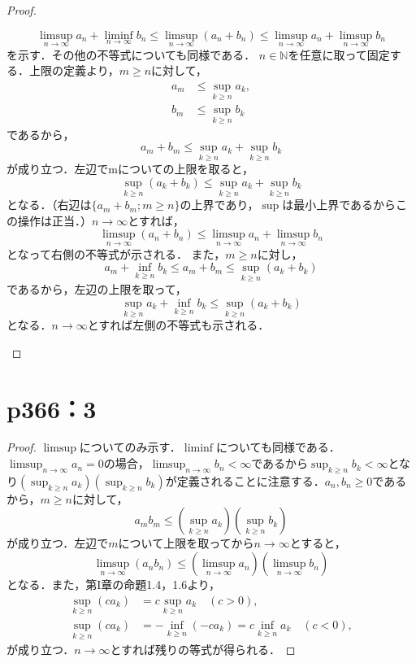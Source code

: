 \documentclass[a4paper,10pt,fleqn]{ltjsarticle}
\begin{document}
  \begin{proof}
    \begin{leftbar}
      \[
        \limsup _{n \to \infty} a_n + \liminf _{n \to \infty} b_n \leq \limsup _{n \to \infty} (a_n + b_n) \leq \limsup _{n \to \infty} a_n + \limsup _{n \to \infty} b_n
      \]
      を示す．その他の不等式についても同様である．
      $n \in \mathbb{N}$を任意に取って固定する．上限の定義より，$m \geq n$に対して，
      \begin{align*}
        a_m &\leq \sup _{k \geq n} a_k, \\
        b_m &\leq \sup _{k \geq n} b_k
      \end{align*}
      であるから，
      \[
        a_m + b_m \leq \sup _{k \geq n} a_k + \sup _{k \geq n} b_k
      \]
      が成り立つ．左辺でmについての上限を取ると，
      \[
        \sup _{k \geq n} (a_k + b_k) \leq \sup _{k \geq n} a_k + \sup _{k \geq n} b_k
      \]
      となる．（右辺は$\{a_m + b_m; m \geq n\}$の上界であり，$\sup$は最小上界であるからこの操作は正当．）$n \to \infty$とすれば，
      \[
        \limsup _{n \to \infty} (a_n + b_n) \leq \limsup _{n \to \infty} a_n + \limsup _{n \to \infty} b_n
      \]
      となって右側の不等式が示される．
      また，$m \geq n$に対し，
      \[
        a_m + \inf _{k \geq n} b_k \leq a_m + b_m \leq \sup _{k \geq n} (a_k + b_k)
      \]
      であるから，左辺の上限を取って，
      \[
        \sup _{k \geq n} a_k + \inf _{k \geq n} b_k \leq \sup _{k \geq n} (a_k + b_k)
      \]
      となる．$n \to \infty$とすれば左側の不等式も示される．
    \end{leftbar}
  \end{proof}

\section*{p366：3}

  \begin{leftbar}
    \begin{proof}
      $\limsup$についてのみ示す．$\liminf$についても同様である．
      $\limsup_{n \to \infty} a_n = 0$の場合，$\limsup_{n \to \infty} b_n < \infty$であるから$\sup_{k \geq n} b_k < \infty$となり$\left(\sup _{k \geq n} a_k\right) \left(\sup _{k \geq n} b_k\right)$が定義されることに注意する．$a_n, b_n \geq 0$であるから，$m \geq n$に対して，
      \[
        a_m b_m \leq \left(\sup _{k \geq n} a_k\right) \left(\sup _{k \geq n} b_k\right)
      \]
      が成り立つ．左辺で$m$について上限を取ってから$n \to \infty$とすると，
      \[
        \limsup_{n \to \infty} (a_n b_n) \leq \left(\limsup _{n \to \infty} a_n\right) \left(\limsup_{n \to \infty} b_n\right)
      \]
      となる．また，第I章の命題1.4，1.6より，
      \begin{align*}
        \sup_{k \geq n} (c a_k) &= c\sup_{k \geq n} a_k \quad (c > 0), \\
        \sup_{k \geq n} (c a_k) &= -\inf_{k \geq n} (-c a_k) = c\inf_{k \geq n} a_k \quad (c < 0),
      \end{align*}
      が成り立つ．$n \to \infty$とすれば残りの等式が得られる．
    \end{proof}
  \end{leftbar}
\end{document}
